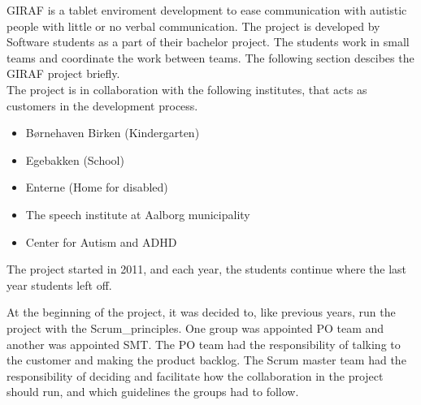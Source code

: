 GIRAF is a tablet enviroment development to ease communication with autistic people with little or no verbal communication. The project is developed by Software students as a part of their bachelor project. The students work in small teams and coordinate the work between teams. The following section descibes the GIRAF project briefly.\\

The project is in collaboration with the following institutes\cite{GirafWebsite}, that acts as customers in the development process.\\

\begin{itemize}
    \item Børnehaven Birken (Kindergarten) \cite{bhBirken}
    \item Egebakken (School) \cite{egebakken}
    \item Enterne (Home for disabled) \cite{enterne}
    \item The speech institute at Aalborg municipality
    \item Center for Autism and ADHD \cite{center_for_autism}
\end{itemize}

The project started in 2011, and each year, the students continue where the last year students left off.

At the beginning of the project, it was decided to, like previous years, run the project with the \gls{Scrum_principles}. One group was appointed \gls{PO} team and another was appointed \gls{SMT}. The \gls{PO} team had the responsibility of talking to the customer and making the product backlog. The Scrum master team had the responsibility of deciding and facilitate how the collaboration in the project should run, and which guidelines the groups had to follow.\\